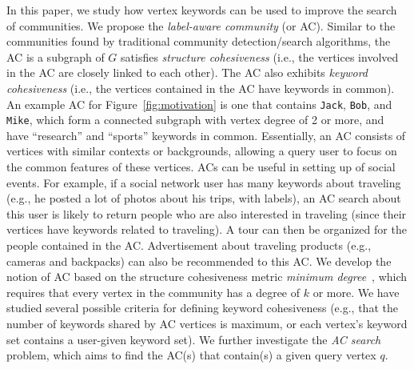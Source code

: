 In this paper, we study how vertex keywords can be used to improve the search of communities. We propose the {\it label-aware community} (or AC). Similar to the communities found by traditional community detection/search algorithms, the AC is a subgraph of $G$ satisfies {\it structure cohesiveness} (i.e., the vertices involved in the AC are closely linked to each other). The AC also exhibits {\it keyword cohesiveness} (i.e., the vertices contained in the AC have keywords in common). An example AC for Figure~\ref{fig:motivation} is one that contains {\tt Jack}, {\tt Bob}, and {\tt Mike}, which form a connected subgraph with vertex degree of 2 or more, and have ``research'' and ``sports'' keywords in common. Essentially, an AC consists of vertices with similar contexts or backgrounds, allowing a query user to focus on the common features of these vertices. ACs can be useful in setting up of social events. For example, if a social network user has many keywords about traveling (e.g., he posted a lot of photos about his trips, with labels), an AC search about this user is likely to return people who are also interested in traveling (since their vertices have keywords related to traveling). A tour can then be organized for the people contained in the AC. Advertisement about traveling products (e.g., cameras and backpacks) can also be recommended to this AC. We develop the notion of AC based on the structure cohesiveness metric {\it minimum degree}~\cite{community-phy2004, community-phy2010,KDD2010,local2014}, which requires that every vertex in the community has a degree of $k$ or more.
We have studied several possible criteria for defining keyword cohesiveness (e.g., that the number of keywords shared by AC vertices is maximum, or each vertex's keyword set contains a user-given keyword set). We further investigate the {\it AC search} problem, which aims to find the AC(s) that contain(s) a given query vertex $q$.

